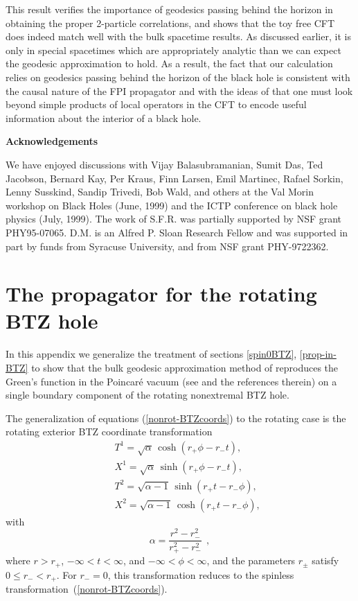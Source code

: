 \documentclass[a4paper,12pt]{article}
\begin{document}
This result 
verifies the importance of geodesics passing behind the horizon
in obtaining the proper 2-particle correlations, and shows that the
toy free CFT does indeed match well with the bulk spacetime results.
As discussed earlier, it is only in special spacetimes which are
appropriately analytic than we can expect the geodesic approximation
to hold.  As a result, the fact that our calculation relies on
geodesics passing behind the horizon of the black hole is consistent
with the causal nature of the FPI propagator and with the ideas of
\cite{joeetal} that one must look beyond simple products of local
operators in the CFT to encode useful information about the interior
of a black hole.

\bigskip
\bigskip
\centerline{\bf Acknowledgements}
\medskip
 
We have enjoyed discussions with Vijay Balasubramanian, Sumit Das, Ted
Jacobson, Bernard Kay, Per Kraus, Finn Larsen, Emil Martinec, Rafael
Sorkin, Lenny Susskind, Sandip Trivedi, Bob Wald, and others at the
Val Morin workshop on Black Holes (June, 1999) and the ICTP conference
on black hole physics (July, 1999).  The work of S.F.R. was partially
supported by NSF grant PHY95-07065.  D.M. is an Alfred P. Sloan
Research Fellow and was supported in part by funds from Syracuse
University, and from NSF grant PHY-9722362.



\appendix
\section{The propagator for the rotating BTZ hole}
\label{app:spinning}

In this appendix we generalize the treatment of sections
\ref{spin0BTZ}, \ref{prop-in-BTZ} to show that the bulk geodesic
approximation method of \cite{holopart} reproduces the Green's
function in the Poincar\'e vacuum (see \cite{esko1} and the references
therein) on a single boundary component of the rotating nonextremal
BTZ hole.

The generalization of equations 
(\ref{nonrot-BTZcoords}) to the rotating case
is the rotating exterior BTZ coordinate transformation
\cite{BTZ} 
\begin{eqnarray}
&&T^1 = \sqrt{\alpha} \, \cosh(r_+ \phi - r_- t), 
\nonumber
\\
&&X^1 = \sqrt{\alpha} \, \sinh(r_+ \phi - r_- t), 
\nonumber
\\
&&T^2 = \sqrt{\alpha-1}
\, 
\sinh(r_+ t - r_- \phi), 
\nonumber
\\
&&X^2 = \sqrt{\alpha-1} 
\, 
\cosh(r_+ t - r_- \phi), 
\end{eqnarray}
with 
\begin{equation}
\alpha = 
\frac{r^2 - r_-^2}{r_+^2 - r_-^2}
\ \ ,
\end{equation}
where $r>r_+$, 
$-\infty < t < \infty$, 
and 
$-\infty < \phi < \infty$, 
and the parameters $r_\pm$ satisfy 
$0 \le r_- < r_+$. For $r_-=0$, this transformation reduces to the
spinless transformation~(\ref{nonrot-BTZcoords}). 
\end{document}
